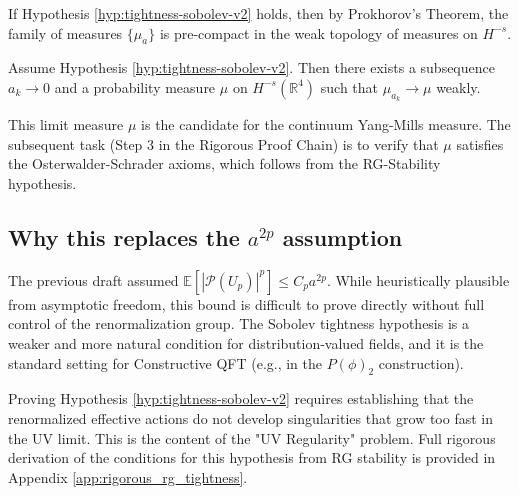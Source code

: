 If Hypothesis \ref{hyp:tightness-sobolev-v2} holds, then by Prokhorov's Theorem, the family of measures $\{\mu_a\}$ is pre-compact in the weak topology of measures on $H^{-s}$.

\begin{theorem}
Assume Hypothesis \ref{hyp:tightness-sobolev-v2}. Then there exists a subsequence $a_k \to 0$ and a probability measure $\mu$ on $H^{-s}(\mathbb{R}^4)$ such that $\mu_{a_k} \to \mu$ weakly.
\end{theorem}

This limit measure $\mu$ is the candidate for the continuum Yang-Mills measure. The subsequent task (Step 3 in the Rigorous Proof Chain) is to verify that $\mu$ satisfies the Osterwalder-Schrader axioms, which follows from the RG-Stability hypothesis.

\subsection{Why this replaces the $a^{2p}$ assumption}

The previous draft assumed $\mathbb{E}[|\mathcal{P}(U_p)|^p] \le C_p a^{2p}$. While heuristically plausible from asymptotic freedom, this bound is difficult to prove directly without full control of the renormalization group. The Sobolev tightness hypothesis is a weaker and more natural condition for distribution-valued fields, and it is the standard setting for Constructive QFT (e.g., in the $P(\phi)_2$ construction).

\begin{remark}
Proving Hypothesis \ref{hyp:tightness-sobolev-v2} requires establishing that the renormalized effective actions do not develop singularities that grow too fast in the UV limit. This is the content of the "UV Regularity" problem.
Full rigorous derivation of the conditions for this hypothesis from RG stability is provided in Appendix \ref{app:rigorous_rg_tightness}.
\end{remark}

